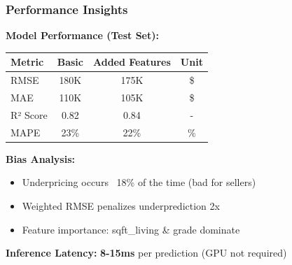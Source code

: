 \documentclass[aspectratio=169]{beamer}
\begin{document}
\begin{frame}
\frametitle{Performance Insights}

\textbf{Model Performance (Test Set):}
\begin{table}
\begin{tabular}{|l|c|c|c|}
\hline
\textbf{Metric} & \textbf{Basic} & \textbf{Added Features} & \textbf{Unit} \\
\hline
RMSE & 180K & 175K & \$ \\
\hline
MAE & 110K & 105K & \$ \\
\hline
R² Score & 0.82 & 0.84 & - \\
\hline
MAPE & 23\% & 22\% & \% \\
\hline
\end{tabular}
\end{table}

\vspace{0.3cm}
\textbf{Bias Analysis:}
\begin{itemize}
    \item Underpricing occurs ~18\% of the time (bad for sellers)
    \item Weighted RMSE penalizes underprediction 2x
    \item Feature importance: sqft\_living \& grade dominate
\end{itemize}

\vspace{0.3cm}
\textbf{Inference Latency:} \textbf{8-15ms} per prediction (GPU not required)
\end{frame}
\end{document}
